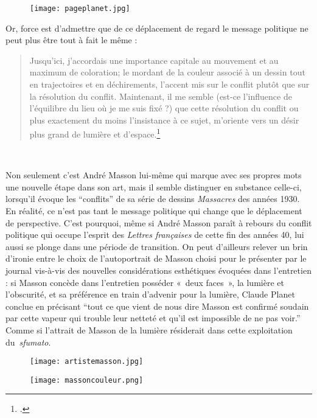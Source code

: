 \begin{figure}[H]
   \centering
   \texttt{[image: pageplanet.jpg]}
	\caption{\cite{entretienmasson}}\label{fig:Planet}
\end{figure}


Or, force est d’admettre que de ce déplacement de regard le message politique ne peut plus être tout à fait le même : 
\begin{quote}
  Jusqu’ici, j’accordais une importance capitale au mouvement et au maximum de coloration; le mordant de la couleur associé à un dessin tout en trajectoires et en déchirements, l’accent mis sur le conflit plutôt que sur la résolution du conflit. Maintenant, il me semble (est-ce l’influence de l’équilibre du lieu où je me suis fixé ?) que cette résolution du conflit ou plus exactement du moins l’insistance à ce sujet, m’oriente vers un désir plus grand de lumière et d’espace.\footcite{entretienmasson}\end{quote}
 

	Non seulement c’est André Masson lui-même qui marque avec ses propres mots une nouvelle étape dans son art, mais il semble distinguer en substance celle-ci, lorsqu’il évoque les \enquote{conflits} de sa série de dessins \emph{Massacres} des années 1930. En réalité, ce n’est pas tant le message politique qui change que le déplacement de perspective. C’est pourquoi, même si André Masson paraît à rebours du conflit politique qui occupe l’esprit des \emph{Lettres françaises} de cette fin des années 40, lui aussi se plonge dans une période de transition. On peut d’ailleurs relever un brin d’ironie entre le choix de l’autoportrait de Masson choisi pour le présenter par le journal vis-à-vis des nouvelles considérations esthétiques évoquées dans l’entretien : si Masson concède dans l’entretien posséder « deux faces », la lumière et l’obscurité, et sa préférence en train d’advenir pour la lumière, Claude Planet conclue en précisant \enquote{tout ce que vient de nous dire Masson est confirmé soudain par cette vapeur qui trouble leur netteté et qu’il est impossible de ne pas voir.} Comme si l’attrait de Masson de la lumière résiderait dans cette exploitation du \emph{sfumato}. 


\begin{figure}[H]
   \centering
   \texttt{[image: artistemasson.jpg]}
	\caption{\cite{entretienmasson}}\label{fig:Autoportrait}
\end{figure}

\begin{figure}[H]
   \centering
   \texttt{[image: massoncouleur.png]}
	\caption{\cite{entretienmasson}}\label{fig:Autoportraitcouleur}
\end{figure}


